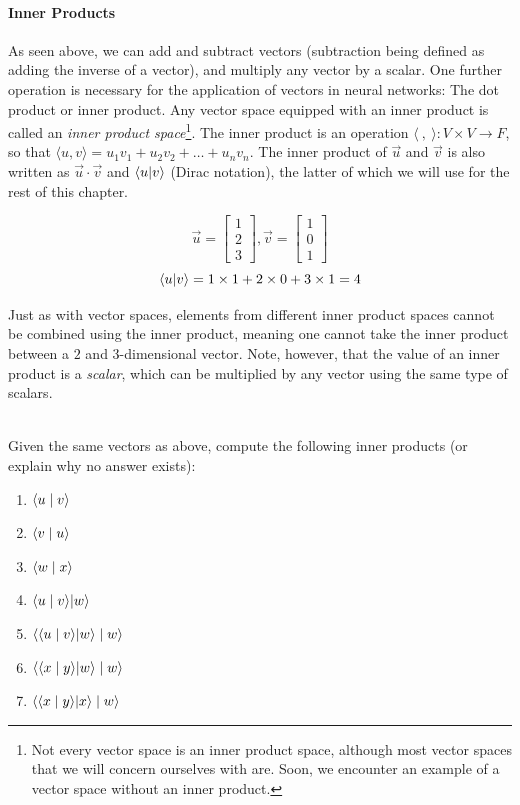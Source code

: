\paragraph{Inner Products}
As seen above, we can add and subtract vectors (subtraction being defined as adding the inverse of a vector), and multiply any vector by a scalar. One further operation is necessary for the application of vectors in neural networks: The dot product or inner product. Any vector space equipped with an inner product is called an \emph{inner product space}\footnote{Not every vector space is an inner product space, although most vector spaces that we will concern ourselves with are. Soon, we encounter an example of a vector space without an inner product.}. The inner product is an operation $\langle\ ,\ \rangle : V \times V \to F$, so that
$\langle u , v \rangle = u_1 v_1 +  u_2 v_2 + \dots +  u_n v_n$. The inner product of $\vec u$ and $\vec v$ is also written as $\vec u \cdot \vec v$ and $\bra{u}\ket{v}$ (Dirac notation), the latter of which we will use for the rest of this chapter.

$$ \vec u = \begin{bmatrix}1 \\ 2 \\ 3\end{bmatrix}, \vec v = \begin{bmatrix} 1 \\ 0 \\ 1 \end{bmatrix} $$
$$ \bra{u}\ket{v} = 1 \times 1 + 2 \times 0 + 3 \times 1 = 4$$

Just as with vector spaces, elements from different inner product spaces cannot be combined using the inner product, meaning one cannot take the inner product between a $2$ and $3$-dimensional vector. Note, however, that the value of an inner product is a \emph{scalar}, which can be multiplied by any vector using the same type of scalars.

\begin{exercise}\mbox{}\\
  Given the same vectors as above, compute the following inner products (or explain why no answer exists):
  \begin{enumerate}[label=\alph*.]
    \item $\langle u \mid v \rangle$
    \item $\langle v \mid u \rangle$
    \item $\langle w \mid x \rangle$
    \item $\langle u \mid v \rangle\vert w\rangle$
    \item $\langle {\langle u \mid v \rangle\vert w\rangle} \mid w \rangle$
    \item $\langle {\langle x \mid y \rangle\vert w\rangle} \mid w \rangle$
    \item $\langle {\langle x \mid y \rangle\vert x\rangle} \mid w \rangle$
  \end{enumerate}
\end{exercise}

